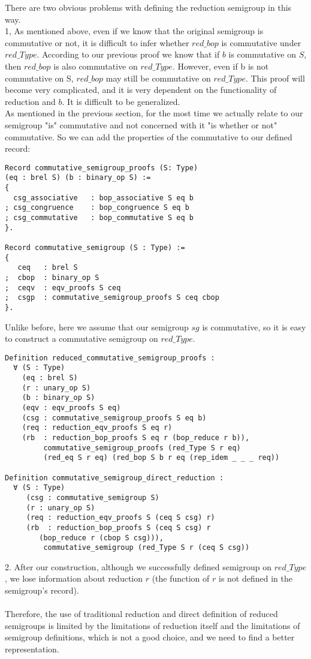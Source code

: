 \documentclass[a4paper,12pt,twoside,openright]{report}
\begin{document}
There are two obvious problems with defining the reduction semigroup in this way.\\
1, As mentioned above, even if we know that the original semigroup is commutative or not, it is difficult to infer whether $red\_bop$ is commutative under $red\_Type$.
According to our previous proof we know that if $b$ is commutative on $S$, then $red\_bop$ is also commutative on $red\_Type$.
However, even if b is not commutative on S, $red\_bop$ may still be commutative on $red\_Type$. This proof will become very complicated, and it is very dependent on the functionality of reduction and $b$. It is difficult to be generalized.\\
As mentioned in the previous section, for the most time we actually relate to our semigroup "is" commutative and not concerned with it "is whether or not" commutative.
So we can add the properties of the commutative to our defined record:
\begin{lstlisting}
Record commutative_semigroup_proofs (S: Type) 
(eq : brel S) (b : binary_op S) := 
{
  csg_associative   : bop_associative S eq b
; csg_congruence    : bop_congruence S eq b
; csg_commutative   : bop_commutative S eq b                                      
}.

Record commutative_semigroup (S : Type) :=
{
   ceq   : brel S      
;  cbop  : binary_op S
;  ceqv  : eqv_proofs S ceq               
;  csgp  : commutative_semigroup_proofs S ceq cbop
}.
\end{lstlisting}
Unlike before, here we assume that our semigroup $sg$ is commutative, so it is easy to construct a commutative semigroup on $red\_Type$.

\begin{lstlisting}
Definition reduced_commutative_semigroup_proofs :
  ∀ (S : Type)
    (eq : brel S)
    (r : unary_op S)
    (b : binary_op S)
    (eqv : eqv_proofs S eq)
    (csg : commutative_semigroup_proofs S eq b)
    (req : reduction_eqv_proofs S eq r)     
    (rb  : reduction_bop_proofs S eq r (bop_reduce r b)), 
         commutative_semigroup_proofs (red_Type S r eq) 
         (red_eq S r eq) (red_bop S b r eq (rep_idem _ _ _ req))

Definition commutative_semigroup_direct_reduction :
  ∀ (S : Type)
     (csg : commutative_semigroup S)
     (r : unary_op S)
     (req : reduction_eqv_proofs S (ceq S csg) r)     
     (rb  : reduction_bop_proofs S (ceq S csg) r 
     	(bop_reduce r (cbop S csg))),
         commutative_semigroup (red_Type S r (ceq S csg))
\end{lstlisting}
2. After our construction, although we successfully defined semigroup on $red\_Type$, we lose information about reduction $r$ (the function of $r$ is not defined in the semigroup's record).\\\\
Therefore, the use of traditional reduction and direct definition of reduced semigroups is limited by the limitations of reduction itself and the limitations of semigroup definitions, which is not a good choice, and we need to find a better representation.
\end{document}
